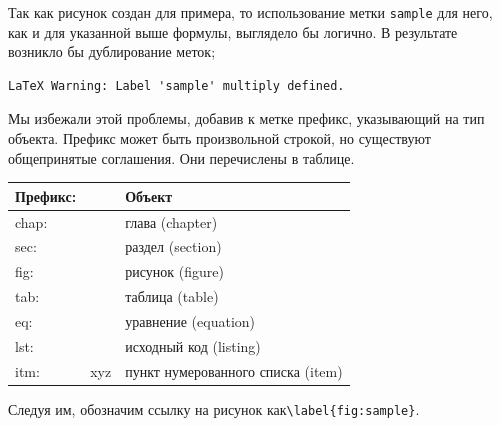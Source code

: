 \documentclass[a4paper,12pt]{article}
\begin{document}
Так как рисунок создан для примера, то использование метки \verb|sample| для него, как и для указанной выше формулы, выглядело бы логично. В результате возникло бы дублирование меток;
\begin{verbatim}
LaTeX Warning: Label 'sample' multiply defined.
\end{verbatim}

Мы избежали этой проблемы, добавив к метке префикс, указывающий на тип объекта. Префикс может быть произвольной строкой, но существуют общепринятые соглашения. Они перечислены в таблице.

\begin{table}[h]
    \centering
    \begin{tabular}{|l|l|l|}
        \hline
        Префикс: &     & Объект                            \\
        \hline
        chap:    &     & глава (chapter)                   \\
        \hline
        sec:     &     & раздел (section)                  \\
        \hline
        fig:     &     & рисунок (figure)                  \\
        \hline
        tab:     &     & таблица (table)                   \\
        \hline
        eq:      &     & уравнение (equation)              \\
        \hline
        lst:     &     & исходный код (listing)            \\
        \hline
        itm:     & xyz & пункт нумерованного списка (item) \\
        \hline
    \end{tabular}
\end{table}


Следуя им, обозначим ссылку на рисунок как\linebreak \verb|\label{fig:sample}|.
\end{document}

